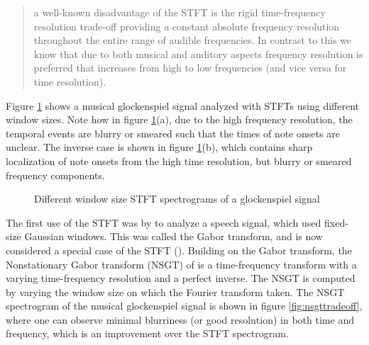 \documentclass[report.tex]{subfiles}
\begin{document}
\begin{quote}
	a well-known disadvantage of the STFT is the rigid time-frequency resolution trade-off providing a constant absolute frequency resolution throughout the entire range of audible frequencies. In contrast to this we know that due to both musical and auditory aspects frequency resolution is preferred that increases from high to low frequencies (and vice versa for time resolution).
\end{quote}

Figure \ref{fig:stfttradeoff} shows a musical glockenspiel signal analyzed with STFTs using different window sizes. Note how in figure \ref{fig:stfttradeoff}(a), due to the high frequency resolution, the temporal events are blurry or smeared such that the times of note onsets are unclear. The inverse case is shown in figure \ref{fig:stfttradeoff}(b), which contains sharp localization of note onsets from the high time resolution, but blurry or smeared frequency components.

\begin{figure}[ht]
	\centering
	\hspace{0.5em}
	\caption{Different window size STFT spectrograms of a glockenspiel signal}
	\label{fig:stfttradeoff}
\end{figure}

The first use of the STFT was by \textcite{gabor1946} to analyze a speech signal, which used fixed-size Gaussian windows. This was called the Gabor transform, and is now considered a special case of the STFT (\cite{dictionary}). Building on the Gabor transform, the Nonstationary Gabor transform (NSGT) of \textcite{balazs} is a time-frequency transform with a varying time-frequency resolution and a perfect inverse. The NSGT is computed by varying the window size on which the Fourier transform taken. The NSGT spectrogram of the musical glockenspiel signal is shown in figure \ref{fig:nsgttradeoff}, where one can observe minimal blurriness (or good resolution) in both time and frequency, which is an improvement over the STFT spectrogram.
\end{document}
